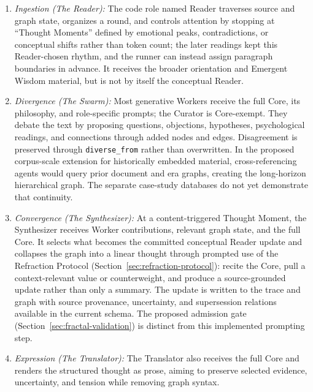 \documentclass[11pt]{article}
\begin{document}
\begin{enumerate}
    \item \emph{Ingestion (The Reader):} The code role named Reader traverses
    source and graph state, organizes a round, and controls attention by stopping
    at ``Thought Moments'' defined by emotional peaks, contradictions, or
    conceptual shifts rather than token count; the later readings kept this Reader-chosen rhythm, and the runner can instead assign paragraph boundaries in advance. It receives the broader
    orientation and Emergent Wisdom material, but is not by itself the
    conceptual Reader.

    \item \emph{Divergence (The Swarm):} Most generative Workers receive the
    full Core, its philosophy, and role-specific prompts; the Curator is
    Core-exempt. They debate the text by proposing questions, objections,
    hypotheses, psychological readings, and connections through added nodes and
    edges. Disagreement is
    preserved through \texttt{diverse\_from} rather than overwritten. In the
    proposed corpus-scale extension for historically embedded material,
    cross-referencing agents would query prior document and era graphs,
    creating the long-horizon hierarchical graph. The separate case-study
    databases do not yet demonstrate that continuity.

    \item \emph{Convergence (The Synthesizer):} At a content-triggered Thought
    Moment, the Synthesizer receives Worker contributions, relevant graph
    state, and the full Core. It selects what becomes the committed conceptual
    Reader update and collapses the graph into a linear thought through prompted
    use of the Refraction Protocol (Section~\ref{sec:refraction-protocol}):
    recite the Core, pull a context-relevant value or counterweight, and produce
    a source-grounded update rather than only a summary. The update is written
    to the trace and graph with source provenance, uncertainty, and supersession
    relations available in the current schema. The proposed admission gate
    (Section~\ref{sec:fractal-validation}) is distinct from this implemented
    prompting step.

    \item \emph{Expression (The Translator):} The Translator also receives
    the full Core and renders the structured thought as prose, aiming to
    preserve selected evidence, uncertainty, and tension while removing graph
    syntax.
\end{enumerate}
\end{document}
